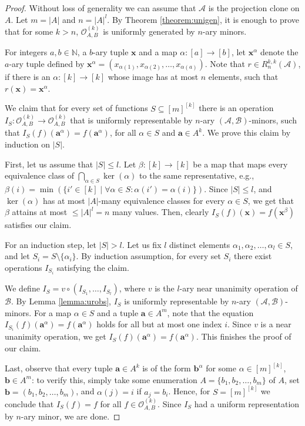 \documentclass[11pt]{amsart}
\theoremstyle{plain}
\theoremstyle{definition}
\newcommand{\N}{{\mathbb N}}
\newcommand{\clone}[1]{\mathcal{#1}}
\newcommand{\clonoid}[1]{\mathcal{#1}}
\newcommand{\clodO}{\clonoid{O}}
\newcommand{\cloA}{\clone{A}}
\newcommand{\cloB}{\clone{B}}
\renewcommand\vec{\mathbf}
\newcommand{\va}{\vec{a}}
\newcommand{\vb}{\vec{b}}
\newcommand{\vx}{\vec{x}}
\begin{document}
\begin{proof}
Without loss of generality we can assume that $\cloA$ is the projection clone on $A$. Let $m = |A|$ and $n = |A|^l$. By Theorem \ref{theorem:unigen}, it is enough to prove that for some $k>n$, $\clodO_{A,B}^{(k)}$ is uniformly generated by $n$-ary minors. 

For integers $a,b\in \N$, a $b$-ary tuple $\vx$ and a map $\alpha \colon [a] \to [b]$, let $\vx^{\alpha}$ denote the $a$-ary tuple defined by $\vx^{\alpha} = (x_{\alpha(1)},x_{\alpha(2)},\ldots, x_{\alpha(a)})$. Note that $r \in R_n^{k,k}(\cloA)$, if there is an $\alpha \colon [k] \to [k]$ whose image has at most $n$ elements, such that $r(\vx) = \vx^{\alpha}$.

We claim that for every set of functions $S \subseteq [m]^{[k]}$ there is an operation $I_S\colon \clodO_{A,B}^{(k)}\rightarrow\clodO_{A,B}^{(k)}$ that is uniformly representable by $n$-ary $(\cloA,\cloB)$-minors, such that $I_S(f)(\va^{\alpha}) = f(\va^{\alpha})$, for all $\alpha \in S$ and $\va \in A^{k}$. We prove this claim by induction on $|S|$.

First, let us assume that $|S| \leq l$. Let $\beta \colon [k] \to [k]$ be a map that maps every equivalence class of $\bigcap_{\alpha \in S} \ker(\alpha)$ to the same representative, e.g., $\beta(i) = \min(\{i' \in [k] \mid  \forall \alpha \in S \colon \alpha(i') = \alpha(i) \})$. Since $|S| \leq l$, and $\ker(\alpha)$ has at most $|A|$-many equivalence classes for every $\alpha \in S$, we get that $\beta$ attains at most $\leq |A|^l = n$ many values. Then, clearly $I_S(f)(\mathbf x) = f(\vx^\beta)$ satisfies our claim.

For an induction step, let $|S|>l$. Let us fix $l$ distinct elements $\alpha_1,\alpha_2,\ldots, \alpha_l \in S$, and let $S_i = S \setminus \{\alpha_i \}$. By induction assumption, for every set $S_i$ there exist operations $I_{S_i}$ satisfying the claim.

We define $I_S = v\circ (I_{S_1},\ldots, I_{S_l})$, where $v$ is the $l$-ary near unanimity operation of $\cloB$. By Lemma \ref{lemma:urobs}, $I_S$ is uniformly representable by $n$-ary $(\cloA,\cloB)$-minors. For a map $\alpha \in S$ and a tuple $\va \in A^m$, note that the equation $I_{S_{i}}(f)(\va^{\alpha}) = f(\va^{\alpha})$ holds for all but at most one index $i$. Since $v$ is a near unanimity operation, we get $I_S(f)(\va^{\alpha}) = f(\va^{\alpha})$. This finishes the proof of our claim.

Last, observe that every tuple $\va \in A^k$ is of the form $\vb^\alpha$ for some $\alpha \in [m]^{[k]}$, $\vb \in A^m$: to verify this, simply take some enumeration $A = \{b_1,b_2,\ldots,b_m\}$ of $A$, set $\vb = (b_1,b_2,\ldots,b_m)$, and $\alpha(j) = i$ if $a_j = b_i$. Hence, for $S = [m]^{[k]}$ we conclude that $I_S(f) = f$ for all $f \in \clodO_{A,B}^{(k)}$. Since $I_S$ had a uniform representation by $n$-ary minor, we are done.
\end{proof}
\end{document}

